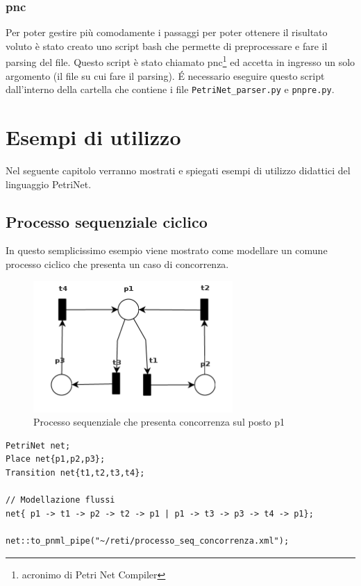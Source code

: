 \documentclass[italian,12pt]{book}
\begin{document}
\subsection{pnc}
Per poter gestire più comodamente i passaggi per poter ottenere il
risultato voluto è stato creato uno script bash che permette di
preprocessare e fare il parsing del file. Questo script è stato
chiamato pnc\footnote{acronimo di Petri Net Compiler} ed accetta in
ingresso un solo argomento (il file su cui fare il parsing). \'E
necessario eseguire questo script dall'interno della cartella che
contiene i file {\tt PetriNet\_parser.py} e {\tt pnpre.py}.


\chapter{Esempi di utilizzo}\label{cap:esempi}
Nel seguente capitolo verranno mostrati e spiegati esempi di utilizzo didattici del linguaggio PetriNet.

\section{Processo sequenziale ciclico}
In questo semplicissimo esempio viene mostrato come modellare un comune processo ciclico che presenta un caso di concorrenza.
\begin{figure}[htb]
\centerline{\includegraphics[height=5cm]{img/processo_seq_concorrenza.png}}
\caption{Processo sequenziale che presenta concorrenza sul posto p1}\label{fig:processo_seq_concorrenza.png}
\end{figure}

\begin{verbatim}PetriNet net;
Place net{p1,p2,p3};
Transition net{t1,t2,t3,t4};

// Modellazione flussi
net{ p1 -> t1 -> p2 -> t2 -> p1 | p1 -> t3 -> p3 -> t4 -> p1};

net::to_pnml_pipe("~/reti/processo_seq_concorrenza.xml");
\end{verbatim}
\end{document}
